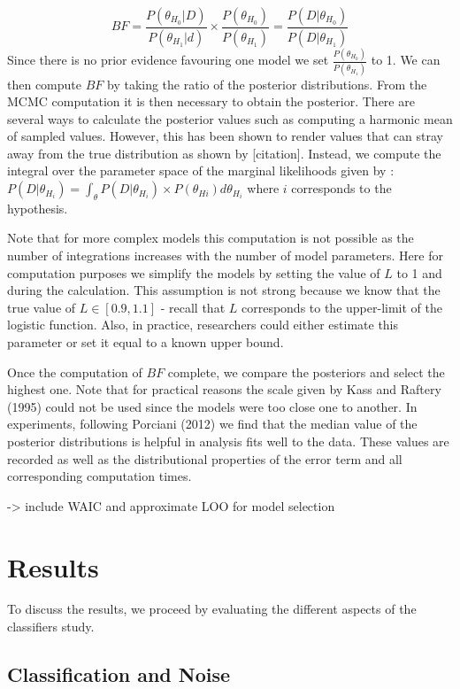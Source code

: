 \documentclass[]{article}
\begin{document}
\[BF =\frac {P(\theta_{H_0}|D)}{P(\theta_{H_1}|d)} \times \frac {P(\theta_{H_0})}{P(\theta_{H_1})} =\frac {P(D|\theta_{H_0})}{P(D|\theta_{H_1})}\]
Since there is no prior evidence favouring one model we set
\(\frac {P(\theta_{H_0})}{P(\theta_{H_1})}\) to 1. We can then compute
\(BF\) by taking the ratio of the posterior distributions. From the MCMC
computation it is then necessary to obtain the posterior. There are
several ways to calculate the posterior values such as computing a
harmonic mean of sampled values. However, this has been shown to render
values that can stray away from the true distribution as shown by
{[}citation{]}. Instead, we compute the integral over the parameter
space of the marginal likelihoods given by :
\(P(D|\theta_{H_i}) = \int_\theta P(D|\theta_{H_i}) \times P(\theta_{Hi}) d\theta_{H_i}\)
where \(i\) corresponds to the hypothesis.

Note that for more complex models this computation is not possible as
the number of integrations increases with the number of model
parameters. Here for computation purposes we simplify the models by
setting the value of \(L\) to 1 and during the calculation. This
assumption is not strong because we know that the true value of
\(L \in [0.9, 1.1]\) - recall that \(L\) corresponds to the upper-limit
of the logistic function. Also, in practice, researchers could either
estimate this parameter or set it equal to a known upper bound.

Once the computation of \(BF\) complete, we compare the posteriors and
select the highest one. Note that for practical reasons the scale given
by Kass and Raftery (1995) could not be used since the models were too
close one to another. In experiments, following Porciani (2012) we find
that the median value of the posterior distributions is helpful in
analysis fits well to the data. These values are recorded as well as the
distributional properties of the error term and all corresponding
computation times.

-\textgreater{} include WAIC and approximate LOO for model selection

\hypertarget{results}{%
\section{Results}\label{results}}

To discuss the results, we proceed by evaluating the different aspects
of the classifiers study.

\hypertarget{classification-and-noise}{%
\subsection{Classification and Noise}\label{classification-and-noise}}
\end{document}
